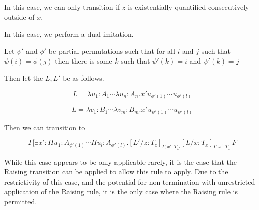 In this case, we can only transition if $z$ is existentially 
quantified consecutively outside of $x$.

In this case, we perform a dual imitation.

Let $\psi'$ and $\phi'$ be partial permutations 
such that for all $i$ and $j$ such that
$\psi(i) = \phi(j)$ then there is some $k$ such that
$\psi'(k) = i$ and $\psi'(k) = j$

Then let the $L,L'$ be as follows.

\[
L = \lambda u_1 : A_1 \cdots \lambda u_n : A_n . x' u_{\phi'(1)} \cdots u_{\phi'(l)}
\]

\[
L = \lambda v_1 : B_1 \cdots \lambda v_m : B_m . x' u_{\psi'(1)} \cdots u_{\psi'(l)}
\]

Then we can transition to

\[
\Gamma [ \exists x' : \Pi u_1 : A_{\phi'(1) } \cdots \Pi u_l : A_{\phi'(l)}
. [L'/z : T_z]_{\Gamma, x': T_{x'}}[L / x : T_x]_{\Gamma, x': T_{x'}} F
\]
 
While this case appears to be only applicable rarely,
it is the case that the Raising transition can be applied to allow this
rule to apply.  
Due to the restrictivity of this case, and the potential
for non termination with unrestricted application of the Raising rule,
it is the only case where the Raising rule is permitted.  
